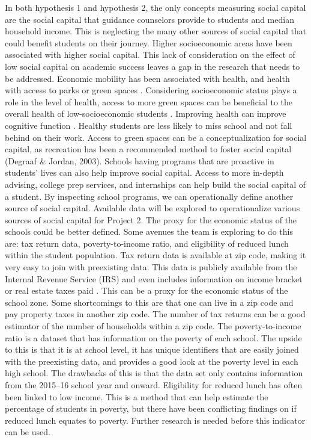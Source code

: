 In both hypothesis 1 and hypothesis 2, the only concepts measuring social capital are the social capital that guidance counselors provide to students and median household income. This is neglecting the many other sources of social capital that could benefit students on their journey. 
Higher socioeconomic areas have been associated with higher social capital. This lack of consideration on the effect of low social capital on academic success leaves a gap in the research that needs to be addressed. 
Economic mobility has been associated with health, and health with access to parks or green spaces \parencite{browning}. 
Considering socioeconomic status plays a role in the level of health, access to more green spaces can be beneficial to the overall health of low-socioeconomic students \parencite{browning}. 
Improving health can improve cognitive function \parencite{browning}. 
Healthy students are less likely to miss school and not fall behind on their work. 
Access to green spaces can be a conceptualization for social capital, as recreation has been a recommended method to foster social capital (Degraaf \& Jordan, 2003).
Schools having programs that are proactive in students' lives can also help improve social capital. 
Access to more in-depth advising, college prep services, and internships can help build the social capital of a student. 
By inspecting school programs, we can operationally define another source of social capital. 
Available data will be explored to operationalize various sources of social capital for Project 2.
The proxy for the economic status of the schools could be better defined. Some avenues the team is exploring to do this are: tax return data, poverty-to-income ratio, and eligibility of reduced lunch within the student population. 
Tax return data is available at zip code, making it very easy to join with preexisting data. This data is publicly available from the Internal Revenue Service (IRS) and even includes information on income bracket or real estate taxes paid \parencite{IRS}.
This can be a proxy for the economic status of the school zone. Some shortcomings to this are that one can live in a zip code and pay property taxes in another zip code. 
The number of tax returns can be a good estimator of the number of households within a zip code. The poverty-to-income ratio is a dataset that has information on the poverty of each school. 
The upside to this is that it is at school level, it has unique identifiers that are easily joined with the preexisting data, and provides a good look at the poverty level in each high school. 
The drawbacks of this is that the data set only contains information from the 2015--16 school year and onward. 
Eligibility for reduced lunch has often been linked to low income. This is a method that can help estimate the percentage of students in poverty, but there have been conflicting findings on if reduced lunch equates to poverty. 
Further research is needed before this indicator can be used. 

